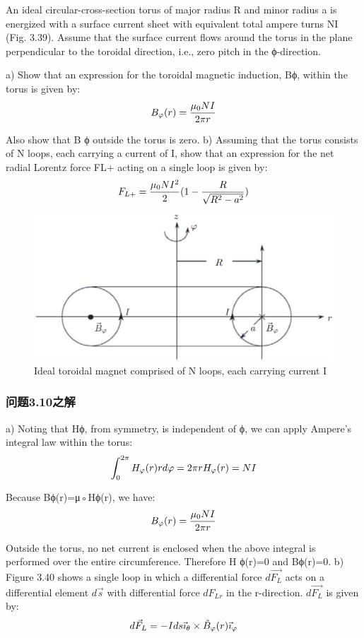 An ideal circular-cross-section torus of major radius R and minor radius a is
energized with a surface current sheet with equivalent total ampere turns NI
(Fig. 3.39). Assume that the surface current flows around the torus in the plane
perpendicular to the toroidal direction, i.e., zero pitch in the ϕ-direction.

a) Show that an expression for the toroidal magnetic induction, Bϕ, within the
torus is given by:
$$
B_{\varphi}(r)=\frac{\mu_{0}NI}{2\pi r}\\%
$$

Also show that B
ϕ outside the torus is zero.
b) Assuming that the torus consists of N loops, each carrying a current of I,
show that an expression for the net radial Lorentz force FL+ acting on a
single loop is given by:
$$
F_{L+}=\frac{\mu_{0}NI^{2}}{2}(1-\frac{R}{\sqrt{R^{2}-a^{2}}})\\%
$$
\begin{figure}[htbp]
	\centering
	\includegraphics[scale=0.5]{chpt3/figs/fig3.39.eps}
	\caption{Ideal toroidal magnet comprised of N loops, each carrying current I}
\end{figure}


\subsubsection{问题3.10之解}
a) Noting that Hϕ, from symmetry, is independent of ϕ, we can apply Ampere’s
integral law within the torus:
$$\int_{0}^{2\pi}H_{\varphi}(r)rd\varphi=2\pi rH_{\varphi}(r)=NI\\%
$$

Because Bϕ(r)=μ◦Hϕ(r), we have:
$$B_{\varphi}(r)=\frac{\mu_{0}NI}{2\pi r}\\%
$$

Outside the torus, no net current is enclosed when the above integral is performed
over the entire circumference. Therefore H
ϕ(r)=0 and Bϕ(r)=0.
b) Figure 3.40 shows a single loop in which a differential force $d\vec{F_L}$ acts on a
differential element $d\vec{s}$ with differential force $dF_{Lr}$ in the r-direction.
$d\vec{F_L}$ is given by:
$$
d\vec{F}_{L}=-Ids\vec{\imath}_{\theta}\times\tilde{B}_{\varphi}(r)\vec{\imath}_{\varphi}\\%
$$

